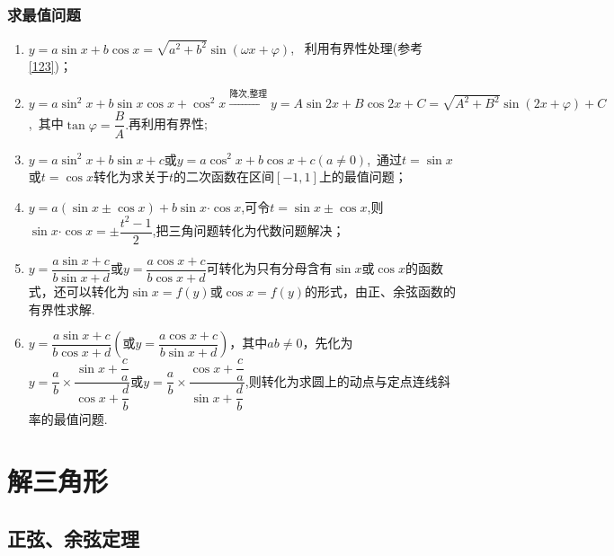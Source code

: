 \documentclass{BHCexam}
\begin{document}
\subsubsection{求最值问题}\begin{enumerate}[(1)]
\item $ y=a\sin x+b\cos x=\sqrt{a^2+b^2}\sin\left(\omega x+\varphi\right) $,~ 利用有界性处理(参考\ref{123})；
\item $ y=a\sin^2x+b\sin x\cos x+\cos^2x \xrightarrow{\text{降次,整理}}y=A\sin 2x+B\cos2x+C=\sqrt{A^2+B^2}\sin(2x+\varphi)+C$,~其中$ \tan\varphi=\dfrac{B}{A} .$再利用有界性;
\item $ y=a\sin^2x+b\sin x+c \text{或}y=a\cos^2x+b\cos x+c(a\ne0)$,~通过$ t=\sin x $或$ t=\cos x $转化为求关于$ t $的二次函数在区间$ \left[-1,1\right]$上的最值问题；
\item $y=a\left(\sin x\pm\cos x\right)+b\sin x\bm{\cdot}\cos x $,可令$ t=\sin x\pm\cos x $,则$ \sin x\bm{\cdot}\cos x=\pm\dfrac{t^2-1}{2} $,把三角问题转化为代数问题解决；
\item $ y=\dfrac{a\sin x+c}{b\sin x+d} $或$ y=\dfrac{a\cos x+c}{b\cos x+d} $可转化为只有分母含有$ \sin x  $或$ \cos x $的函数式，还可以转化为$ \sin x=f(y) $或$ \cos x=f(y) $的形式，由正、余弦函数的有界性求解.
\item $y=\dfrac{a\sin x+c}{b\cos x+d}\left(\text{或}y=\dfrac{a\cos x+c}{b\sin x+d}\right)$，其中$ ab\ne0 $，先化为$ y=\dfrac{a}{b}\times\dfrac{\sin x+\dfrac{c}{a}}{\cos x+\dfrac{d}{b}} \text{或}y=\dfrac{a}{b}\times\dfrac{\cos x+\dfrac{c}{a}}{\sin x+\dfrac{d}{b}} $,则转化为求圆上的动点与定点连线斜率的最值问题.
\end{enumerate}
\section{解三角形}
\subsection{正弦、余弦定理}
\end{document}
